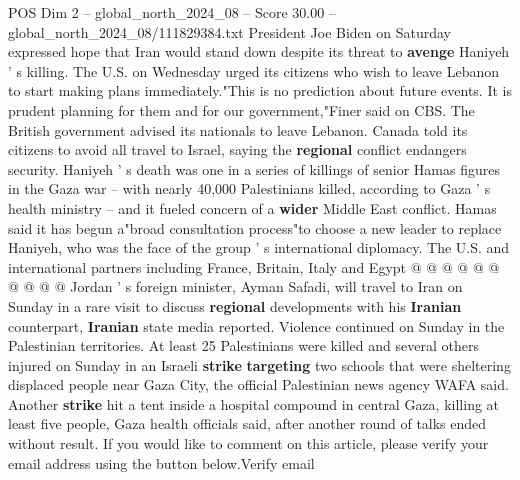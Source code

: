 \begin{textsample}{POS Dim 2 – global\_north\_2024\_08 – Score 30.00 – global\_north\_2024\_08/111829384.txt}
President Joe Biden on Saturday expressed hope that Iran would stand down despite its threat to \textbf{avenge} Haniyeh ' s killing.
The U.S. on Wednesday urged its citizens who wish to leave Lebanon to start making plans immediately."This is no prediction about future events.
It is prudent planning for them and for our government,"Finer said on CBS.
The British government advised its nationals to leave Lebanon.
Canada told its citizens to avoid all travel to Israel, saying the \textbf{regional} conflict endangers security.
Haniyeh ' s death was one in a series of killings of senior Hamas figures in the Gaza war -- with nearly 40,000 Palestinians killed, according to Gaza ' s health ministry -- and it fueled concern of a \textbf{wider} Middle East conflict.
Hamas said it has begun a"broad consultation process"to choose a new leader to replace Haniyeh, who was the face of the group ' s international diplomacy.
The U.S. and international partners including France, Britain, Italy and Egypt @ @ @ @ @ @ @ @ @ @ Jordan ' s foreign minister, Ayman Safadi, will travel to Iran on Sunday in a rare visit to discuss \textbf{regional} developments with his \textbf{Iranian} counterpart, \textbf{Iranian} state media reported.
Violence continued on Sunday in the Palestinian territories.
At least 25 Palestinians were killed and several others injured on Sunday in an Israeli \textbf{strike} \textbf{targeting} two schools that were sheltering displaced people near Gaza City, the official Palestinian news agency WAFA said.
Another \textbf{strike} hit a tent inside a hospital compound in central Gaza, killing at least five people, Gaza health officials said, after another round of talks ended without result.
If you would like to comment on this article, please verify your email address using the button below.Verify email

\end{textsample}

